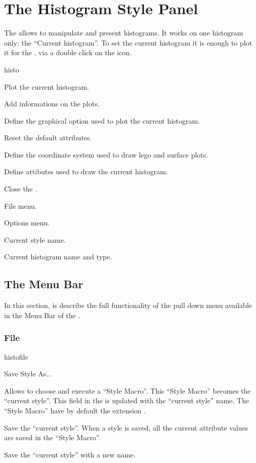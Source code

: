 \section{The Histogram Style Panel}
The \HSP{} allows to manipulate and present histograms. It works on
one histogram only: the ``Current histogram''. To set the current histogram
it is enough to plot it for the \MB, via a double click on the icon.

\begin{PAWf}[.7]{histo}
\begin{EnumZB}
\item Plot the current histogram.
\item Add informations on the plots.
\item Define the graphical option used to plot the current histogram.
\item Reset the default attributes.
\item Define the coordinate system used to draw lego and surface plots.
\item Define attibutes used to draw the current histogram.
\item Close the \HSP.
\end{EnumZB}
\begin{EnumZW}
\item File menu.
\item Options menu.
\item Current style name.
\item Current histogram name and type.
\end{EnumZW}
\end{PAWf}

\subsection{The \HSP{} Menu Bar}
In this section, is describe the full functionality of the pull down
menu available in the Menu Bar of the \HSP.


\subsubsection{File}

\begin{PAWf}{histofile}
\begin{DLsf}{Save Style As...} 
\item[Open Style] Allows to choose and execute a ``Style Macro''.
                  This ``Style Macro'' becomes the ``current style''. This
                  field  in the \HSP{} is updated with the 
                  ``current style'' name. The ``Style Macro'' have by default
                  the extension .
\item[Save Style] Save the ``current style''. When a style is saved, all the
                  current attribute values are saved in the ``Style Macro''. 
\item[Save Style As...] Save the ``current style'' with a new name. 
\item[Close] 
\end{DLsf}
\end{PAWf}


